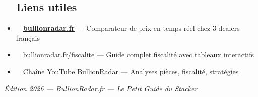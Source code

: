 \documentclass[14pt,a4paper]{extarticle}
\begin{document}
\medskip

\subsection*{\faLink~~Liens utiles}

\begin{itemize}[leftmargin=2em]
  \item \faGlobe~~\href{https://bullionradar.fr}{\textbf{bullionradar.fr}} --- Comparateur de prix en temps réel chez 3 dealers français
  \item \faFileAlt~~\href{https://bullionradar.fr/fiscalite}{bullionradar.fr/fiscalite} --- Guide complet fiscalité avec tableaux interactifs
  \item \faYoutube~~\href{https://www.youtube.com/@BullionRadar}{Chaîne YouTube BullionRadar} --- Analyses pièces, fiscalité, stratégies
\end{itemize}

\medskip

\begin{center}
\end{center}

\medskip

\begin{center}
\textit{Édition 2026 --- BullionRadar.fr --- Le Petit Guide du Stacker}
\end{center}
\end{document}
